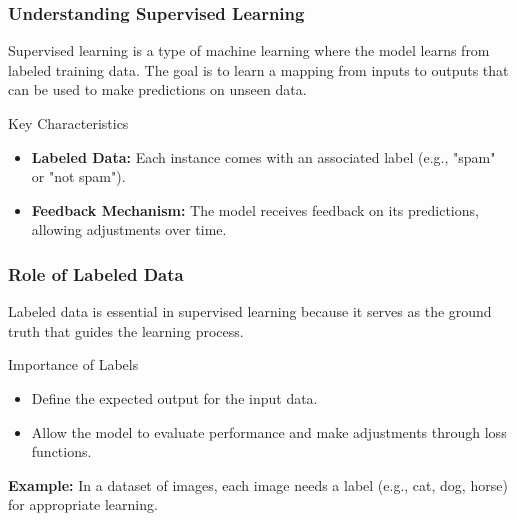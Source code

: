 \documentclass[aspectratio=169]{beamer}
\begin{document}
\begin{frame}[fragile]
    \frametitle{Understanding Supervised Learning}
    Supervised learning is a type of machine learning where the model learns from labeled training data. 
    The goal is to learn a mapping from inputs to outputs that can be used to make predictions on unseen data.

    \begin{block}{Key Characteristics}
        \begin{itemize}
            \item \textbf{Labeled Data:} Each instance comes with an associated label (e.g., "spam" or "not spam").
            \item \textbf{Feedback Mechanism:} The model receives feedback on its predictions, allowing adjustments over time.
        \end{itemize}
    \end{block}
\end{frame}

\begin{frame}[fragile]
    \frametitle{Role of Labeled Data}
    Labeled data is essential in supervised learning because it serves as the ground truth that guides the learning process.

    \begin{block}{Importance of Labels}
        \begin{itemize}
            \item Define the expected output for the input data.
            \item Allow the model to evaluate performance and make adjustments through loss functions.
        \end{itemize}
    \end{block}

    \textbf{Example:} In a dataset of images, each image needs a label (e.g., cat, dog, horse) for appropriate learning.
\end{frame}
\end{document}
